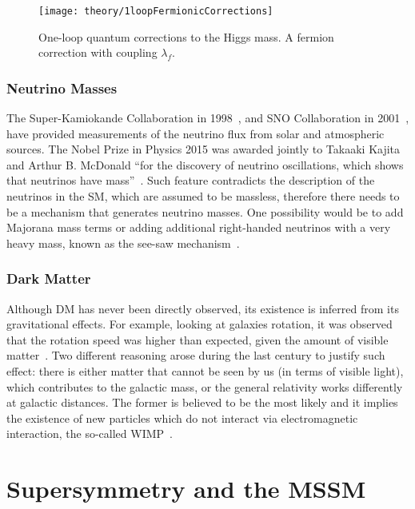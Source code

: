 			\begin{figure}
				\centering
				\texttt{[image: theory/1loopFermionicCorrections]}
				\caption{\label{fig:higgs_f_coupling} One-loop quantum corrections to the Higgs mass. A fermion correction with coupling $\lambda_f$.}
			\end{figure}



		\subsubsection*{Neutrino Masses}

			The Super-Kamiokande Collaboration in 1998~\cite{SK1998}, and SNO Collaboration in 2001~\cite{SNO2001}, have provided measurements of the neutrino flux from solar and atmospheric sources. 
			The Nobel Prize in Physics 2015 was awarded jointly to Takaaki Kajita and Arthur B. McDonald ``for the discovery of neutrino oscillations, which shows that neutrinos have mass''~\cite{Nobel2015}. Such feature contradicts the description of the neutrinos in the \ac{SM}, which are assumed to be massless, therefore there needs to be a mechanism that generates neutrino masses. One possibility would be to add Majorana mass terms or adding additional right-handed neutrinos with a very heavy mass, known as the see-saw mechanism~\cite{Akhmedov1999}.


		\subsubsection*{Dark Matter}

			Although \ac{DM} has never been directly observed, its existence is inferred from its gravitational effects. For example, looking at galaxies rotation, it was observed that the rotation speed was higher than expected, given the amount of visible matter~\cite{Rubin1970}. Two different reasoning arose during the last century to justify such effect: there is either matter that cannot be seen by us (in terms of visible light), which contributes to the galactic mass, or the general relativity works differently at galactic distances. The former is believed to be the most likely and it implies the existence of new particles which do not interact via electromagnetic interaction, the so-called \ac{WIMP}~\cite{oro44361}.







	\section{Supersymmetry and the MSSM}
	\label{sec:SUSY}

